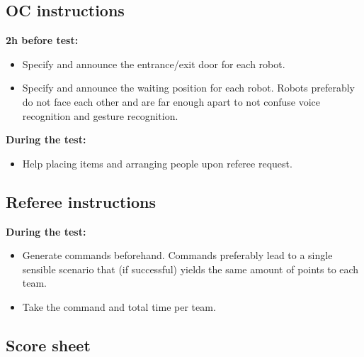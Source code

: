 \subsection{OC instructions}
\textbf{2h before test:}
\begin{itemize}
	\item Specify and announce the entrance/exit door for each robot. 
	\item Specify and announce the waiting position for each robot. Robots preferably do not face each other and are far enough apart to not confuse voice recognition and gesture recognition.
\end{itemize}
\textbf{During the test:}
\begin{itemize}
	\item Help placing items and arranging people upon referee request.
\end{itemize}

\subsection{Referee instructions}
\textbf{During the test:}
\begin{itemize}
	\item Generate commands beforehand. Commands preferably lead to a single sensible scenario that (if successful) yields the same amount of points to each team. 
	\item Take the command and total time per team.
\end{itemize}


\newpage
\subsection{Score sheet}


 

